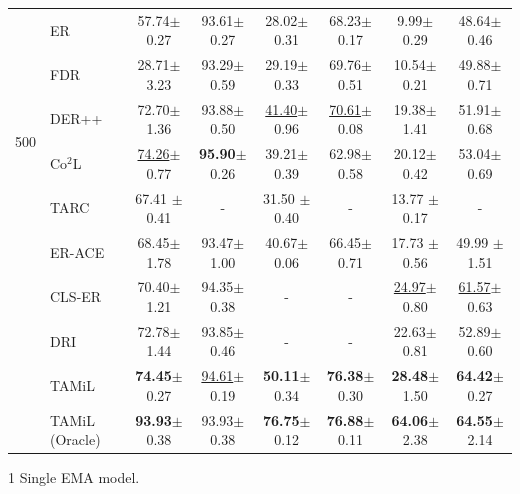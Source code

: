 \documentclass{article} %
\begin{document}
{\begin{threeparttable}[t]
\begin{tabular}{ll|cc|cc|cc}
\multirow{6}{*}{500}  
  & ER  & 57.74\scriptsize{$\pm$0.27} & 93.61\scriptsize{$\pm$0.27} & 28.02\scriptsize{$\pm$0.31} & 68.23\scriptsize{$\pm$0.17} & 9.99\scriptsize{$\pm$0.29} & 48.64\scriptsize{$\pm$0.46}  \\
   & FDR  & 28.71\scriptsize{$\pm$3.23} & 93.29\scriptsize{$\pm$0.59} & 29.19\scriptsize{$\pm$0.33} & 69.76\scriptsize{$\pm$0.51}& 10.54\scriptsize{$\pm$0.21} & 49.88\scriptsize{$\pm$0.71} \\
  & DER++  & 72.70\scriptsize{$\pm$1.36} & 93.88\scriptsize{$\pm$0.50} & \underline{41.40}\scriptsize{$\pm$0.96} & \underline{70.61}\scriptsize{$\pm$0.08} & 19.38\scriptsize{$\pm$1.41}  & 51.91\scriptsize{$\pm$0.68} \\
    & Co$^{2}$L  &   \underline{74.26}\scriptsize{$\pm$0.77} & \textbf{95.90}\scriptsize{$\pm$0.26} & 39.21\scriptsize{$\pm$0.39} & 62.98\scriptsize{$\pm$0.58} &  20.12\scriptsize{$\pm$0.42} & 53.04\scriptsize{$\pm$0.69} \\
     & TARC  &  67.41 \scriptsize{$\pm$0.41}& - & 31.50 \scriptsize{$\pm$0.40} & - & 13.77 \scriptsize{$\pm$0.17} & - \\
  & ER-ACE  & 68.45\scriptsize{$\pm$1.78} & 93.47\scriptsize{$\pm$1.00} & 40.67\scriptsize{$\pm$0.06} & 66.45\scriptsize{$\pm$0.71} &  17.73 \scriptsize{$\pm$ 0.56}  & 49.99 \scriptsize{$\pm$1.51} \\
  & CLS-ER\tnote{1}  &	70.40\scriptsize{$\pm$1.21}  & 94.35\scriptsize{$\pm$0.38}  & - & - & \underline{24.97}\scriptsize{$\pm$0.80} & \underline{61.57}\scriptsize{$\pm$0.63} \\
  & DRI  &  72.78\scriptsize{$\pm$1.44} & 93.85\scriptsize{$\pm$0.46} & - & - & 22.63\scriptsize{$\pm$0.81} & 52.89\scriptsize{$\pm$0.60} \\
  & TAMiL  & \textbf{74.45}\scriptsize{$\pm$0.27} & \underline{94.61}\scriptsize{$\pm$0.19}& \textbf{50.11}\scriptsize{$\pm$0.34} & \textbf{76.38}\scriptsize{$\pm$0.30}& \textbf{28.48}\scriptsize{$\pm$1.50}& \textbf{64.42}\scriptsize{$\pm$0.27} \\
  \midrule
  & TAMiL (Oracle)  & \textbf{93.93}\scriptsize{$\pm$0.38} & 93.93\scriptsize{$\pm$0.38}& \textbf{76.75}\scriptsize{$\pm$0.12} & \textbf{76.88}\scriptsize{$\pm$0.11}& \textbf{64.06}\scriptsize{$\pm$2.38}& \textbf{64.55}\scriptsize{$\pm$2.14} \\
\bottomrule
\end{tabular}
\begin{tablenotes}
\item [1] Single EMA model. 
\end{tablenotes}
\end{threeparttable}}
\end{document}
